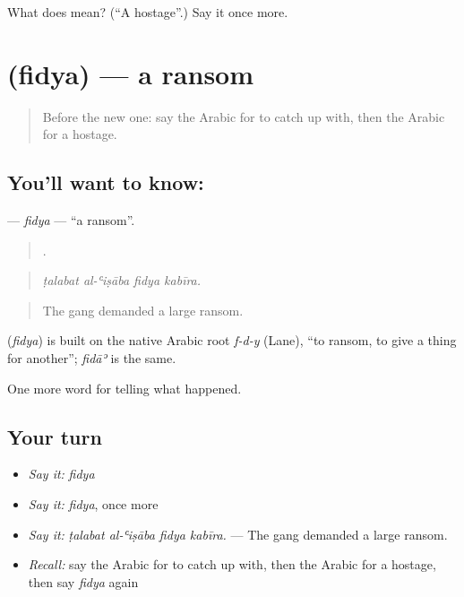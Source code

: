 \begin{tcolorbox}[breakable,colback=teal!4,colframe=teal!35!black,title={Before you move on}]
What does  mean? (\textquotedblleft{}A hostage\textquotedblright{}.) Say it once more.
\end{tcolorbox}
\section[\texorpdfstring{\ar{فدية} (fidya)}{فدية (fidya)}]{ (fidya) — a ransom}

\label{lesson:AR-C347-fidya}



\begin{quote}
Before the new one: say the Arabic for to catch up with, then the Arabic for a hostage.
\end{quote}

\subsection*{You'll want to know: }
\textbf{} — \emph{fidya} — \textquotedblleft{}a ransom\textquotedblright{}.

\begin{quote}
   .
\end{quote}

\begin{quote}
\emph{ṭalabat al-ʿiṣāba fidya kabīra.}
\end{quote}

\begin{quote}
The gang demanded a large ransom.
\end{quote}

\begin{cousinweb}
\textbf{} (\emph{fidya}) is built on the native Arabic root \emph{f-d-y} (Lane), \textquotedblleft{}to ransom, to give a thing for another\textquotedblright{}; \emph{fidāʾ} is the same.
\end{cousinweb}

\begin{grammarlens}[title={What you've built}]
One more word for telling what happened.
\end{grammarlens}

\subsection*{Your turn}
\begin{itemize}
\raggedright
  \item \emph{Say it:} \emph{fidya}
  \item \emph{Say it:} \emph{fidya}, once more
  \item \emph{Say it:} \emph{ṭalabat al-ʿiṣāba fidya kabīra.} — The gang demanded a large ransom.
  \item \emph{Recall:} say the Arabic for to catch up with, then the Arabic for a hostage, then say \emph{fidya} again
\end{itemize}

